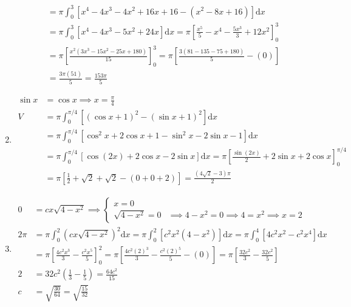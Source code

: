 \documentclass[12pt, A4]{report}
\renewcommand{\d}{\text{d}}
\begin{document}
\begin{enumerate}
\begin{align*}
							&= \pi\int_0^3\left[x^4 - 4x^3 - 4x^2 + 16x + 16 - \left(x^2 - 8x + 16\right)\right]\d x \\
							&= \pi\int_0^3\left[x^4 - 4x^3 - 5x^2 + 24x\right]\d x
								= \pi\left[\frac{x^5}{5} - x^4 - \frac{5x^3}{3} + 12x^2\right]_0^3 \\
							&= \pi\left[\frac{x^2\left(3x^3 - 15x^2 - 25x + 180\right)}{15}\right]_0^3
								= \pi\left[\frac{3(81 - 135 - 75 + 180)}{5} - (0)\right] \\
							&= \frac{3\pi(51)}{5} = \frac{153\pi}{5}
					\end{align*}
				\item
					\begin{align*}
						\sin x &= \cos x 
								\implies x = \frac{\pi}{4} \\
						V &= \pi\int_0^{\pi/4}\left[(\cos x + 1)^2 - (\sin x + 1)^2\right]\d x \\
							&= \pi\int_0^{\pi/4}\left[\cos^2x + 2\cos x + 1 - \sin^2 x - 2\sin x - 1\right]\d x \\
							&= \pi\int_0^{\pi/4}\left[\cos(2x) + 2\cos x - 2\sin x\right]\d x
								= \pi\left[\frac{\sin(2x)}{2} + 2\sin x + 2\cos x\right]_0^{\pi/4} \\
							&= \pi\left[\frac{1}{2} + \sqrt{2} + \sqrt{2} - (0 + 0 + 2)\right]
								= \frac{(4\sqrt{2} - 3)\pi}{2}
					\end{align*}								
				\item
					\begin{align*}
						0 &= cx\sqrt{4 - x^2} \implies 
							\begin{cases}
	 							x = 0 \\
	 							\sqrt{4 - x^2} = 0 &\implies 4 - x^2 = 0 
	 								\implies 4 = x^2 
	 								\implies x = 2
							\end{cases} \\
						2\pi &= \pi\int_0^2\left(cx\sqrt{4 - x^2}\right)^2\d x
									= \pi\int_0^2\left[c^2x^2(4 - x^2)\right]\d x
									= \pi\int_0^4\left[4c^2x^2 - c^2x^4\right]\d x \\
								&= \pi\left[\frac{4c^2x^3}{3} - \frac{c^2x^5}{5}\right]_0^2
									= \pi\left[\frac{4c^2(2)^3}{3} - \frac{c^2(2)^5}{5} - (0)\right]
									= \pi\left[\frac{32c^2}{3} - \frac{32c^2}{5}\right] \\
							2 &= 32c^2\left(\frac{1}{3} - \frac{1}{5}\right) 
									= \frac{64c^2}{15} \\
							c &= \sqrt{\frac{30}{64}} = \sqrt{\frac{15}{32}}
					\end{align*}

\end{enumerate}
\end{document}
